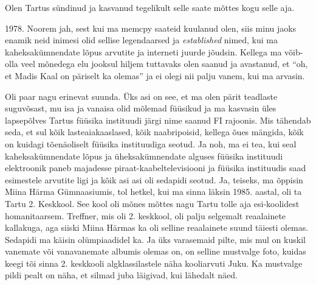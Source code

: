 
                 
Olen Tartus sündinud ja kasvanud tegelikult selle saate mõttes kogu selle aja. 


1978. Noorem jah, sest kui ma memcpy  saateid kuulanud olen, siis minu jaoks enamik neid inimesi olid sellise legendaarsed ja \emph{established} nimed, kui ma kaheksakümnendate lõpus arvutite ja interneti juurde jõudsin. Kellega ma võib-olla veel mõnedega elu jooksul hiljem tuttavaks olen saanud ja avastanud, et \enquote{oh, et Madis Kaal on  päriselt ka olemas} ja ei olegi nii palju vanem, kui ma arvasin.


Oli paar nagu erinevat suunda. Üks asi on see, et ma olen pärit teadlaste suguvõsast,  mu isa ja vanaisa olid mõlemad füüsikud  ja ma kasvasin üles lapsepõlves Tartus füüsika instituudi järgi nime saanud FI rajoonis. Mis tähendab seda, et sul kõik lasteaiakaaslased, kõik naabripoisid, kellega õues mängida, kõik on kuidagi tõenäoliselt füüsika instituudiga seotud. Ja noh, ma ei tea, kui seal kaheksakümnendate lõpus ja üheksakümnendate alguses füüsika instituudi elektroonik paneb majadesse piraat-kaabeltelevisiooni ja füüsika instituudis saad esimestele arvutite ligi ja kõik asi asi oli sedapidi seotud. Ja, teiseks, ma õppisin Miina Härma Gümnaasiumis, tol hetkel, kui ma sinna läksin 1985. aastal, oli ta Tartu 2. Keskkool. See kool oli mõnes mõttes nagu Tartu tolle aja esi-koolidest homanitaarsem. Treffner, mis oli 2. keskkool, oli palju selgemalt reaalainete kallakuga, aga siiski Miina Härmas ka oli selline reaalainete suund täiesti olemas. Sedapidi ma käisin olümpiaadidel ka. Ja üks varasemaid pilte, mis mul on kuskil vanemate või vanavanemate albumis olemas on, on selline mustvalge foto, kuidas keegi tõi sinna 2. keskkooli algklassilastele näha kooliarvuti Juku. Ka mustvalge pildi pealt on näha, et silmad juba läigivad, kui lähedalt näed.

